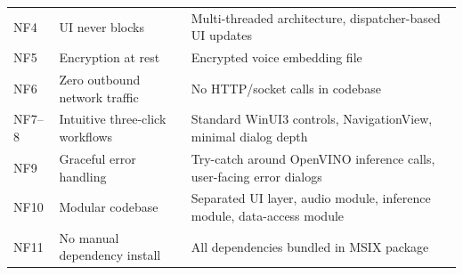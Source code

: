 \begin{longtable}{l p{5.2cm} p{6.8cm}}
NF4 & UI never blocks & Multi-threaded architecture, dispatcher-based UI updates \\
NF5 & Encryption at rest & Encrypted voice embedding file \\
NF6 & Zero outbound network traffic & No HTTP/socket calls in codebase\\
NF7--8 & Intuitive three-click workflows & Standard WinUI3 controls, NavigationView, minimal dialog depth \\
NF9 & Graceful error handling & Try-catch around OpenVINO inference calls, user-facing error dialogs \\
NF10 & Modular codebase & Separated UI layer, audio module, inference module, data-access module \\
NF11 & No manual dependency install & All dependencies bundled in MSIX package \\
\end{longtable}